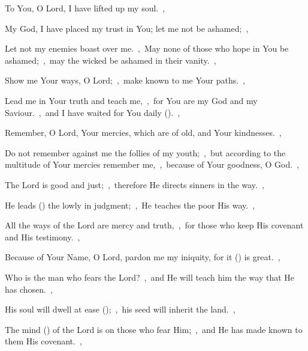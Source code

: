 \documentclass[12pt,twoside,a5paper]{article}
\begin{document}



\begin{normalparskip}
  To You, O Lord, I have lifted up my soul.~\sep

  My God, I have placed my trust in You; let me not be ashamed;~\sep


  Let not my enemies boast over me.~\sep\ May none of those who hope in You be ashamed;~\sep\ may the wicked be ashamed in their vanity.~\sep

  Show me Your ways, O Lord;~\sep\ make known to me Your paths.~\sep

  Lead me in Your truth and teach me,~\sep\ for You are my God and my Saviour.~\sep\ and I have waited for You daily ().~\sep

  Remember, O Lord, Your mercies, which are of old, and Your kindnesses.~\sep

  Do not remember against me the follies of my youth;~\sep\ but according to the multitude of Your mercies remember me,~\sep\ because of Your goodness, O God.~\sep

  The Lord is good and just;~\sep\ therefore He directs sinners in the way.~\sep

  He leads () the lowly in judgment;~\sep\ He teaches the poor His way.~\sep

  All the ways of the Lord are mercy and truth,~\sep\ for those who keep His covenant and His testimony.~\sep

  Because of Your Name, O Lord, pardon me my iniquity, for it () is great.~\sep

  Who is the man who fears the Lord?~\sep\ and He will teach him the way that He has chosen.~\sep

  His soul will dwell at ease ();~\sep\ his seed will inherit the land.~\sep

  The mind () of the Lord is on those who fear Him;~\sep\ and He has made known to them His covenant.~\sep


\end{normalparskip}
\end{document}
